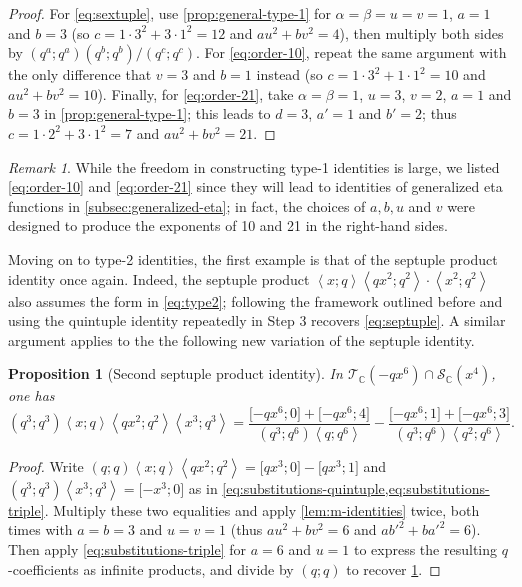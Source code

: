 \documentclass[reqno,11pt]{amsart}
\newtheorem{proposition}[theorem]{Proposition}
\theoremstyle{definition}
\theoremstyle{remark}
\newtheorem*{remark}{Remark}
\numberwithin{equation}{section}
\newcommand{\C}{\mathbb{C}}
\newcommand{\mT}{\mathcal{T}}
\newcommand{\mS}{\mathcal{S}}
\newcommand{\la}{\left\langle}
\newcommand{\ra}{\right\rangle}
\newcommand{\vect}[2]{\big[{#1};{#2}\big]}
\begin{document}
\begin{proof}
For \cref{eq:sextuple}, use \cref{prop:general-type-1} for $\alpha = \beta = u = v = 1$, $a = 1$ and $b = 3$ (so $c = 1 \cdot 3^2 + 3 \cdot 1^2 = 12$ and $au^2 + bv^2 = 4$), then multiply both sides by $\left(q^a; q^a\right)\left(q^b; q^b\right) / \left(q^{c}; q^{c}\right)$. For \cref{eq:order-10}, repeat the same argument with the only difference that $v = 3$ and $b = 1$ instead (so $c = 1 \cdot 3^2 + 1 \cdot 1^2 = 10$ and $au^2 + bv^2 = 10$). Finally, for \cref{eq:order-21}, take $\alpha = \beta = 1$, $u = 3$, $v = 2$, $a = 1$ and $b = 3$ in \cref{prop:general-type-1}; this leads to $d = 3$, $a' = 1$ and $b' = 2$; thus $c = 1 \cdot 2^2 + 3 \cdot 1^2 = 7$ and $au^2 + bv^2 = 21$.
\end{proof}

\begin{remark}
While the freedom in constructing type-1 identities is large, we listed \cref{eq:order-10} and \cref{eq:order-21} since they will lead to identities of generalized eta functions in \cref{subsec:generalized-eta}; in fact, the choices of $a, b, u$ and $v$ were designed to produce the exponents of 10 and 21 in the right-hand sides.
\end{remark}
Moving on to type-2 identities, the first example is that of the septuple product identity once again. Indeed, the septuple product $\la x; q \ra \la qx^2; q^2 \ra \cdot \la x^2; q^2 \ra$ also assumes the form in \cref{eq:type2}; following the framework outlined before and using the quintuple identity repeatedly in Step 3 recovers \cref{eq:septuple}. A similar argument applies to the the following new variation of the septuple identity.
\begin{proposition}[Second septuple product identity] \label{prop:septuple2} 
In $\mT_\C\left(-qx^6\right) \cap \mS_\C\left(x^4\right)$, one has
\begin{equation} \label{eq:septuple2}
    \left(q^3; q^3\right)\la x; q \ra \la qx^2; q^2 \ra \la x^3; q^3 \ra 
    =
    \frac{\vect{-qx^6}{0} + \vect{-qx^6}{4}}{\left(q^3; q^6\right) \la q; q^6 \ra} - \frac{\vect{-qx^6}{1} + \vect{-qx^6}{3}}{\left(q^3; q^6\right) \la q^2; q^6 \ra}.
\end{equation}
\end{proposition}
\begin{proof}
Write $(q; q)\la x; q \ra \la qx^2; q^2 \ra = \vect{qx^3}{0} - \vect{qx^3}{1}$ and $\left(q^3; q^3\right)\la x^3; q^3 \ra = \vect{-x^3}{0}$ as in \cref{eq:substitutions-quintuple,eq:substitutions-triple}. Multiply these two equalities and apply \cref{lem:m-identities} twice, both times with $a = b = 3$ and $u = v = 1$ (thus $au^2 + bv^2 = 6$ and $ab'^2 + ba'^2 = 6$). Then apply \cref{eq:substitutions-triple} for $a = 6$ and $u = 1$ to express the resulting $q$-coefficients as infinite products, and divide by $(q; q)$ to recover \cref{prop:septuple2}.
\end{proof}
\end{document}
